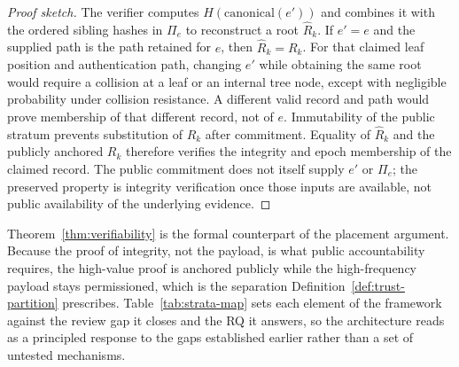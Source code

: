 \begin{proof}[Proof sketch]
The verifier computes $H(\mathrm{canonical}(e'))$ and combines it with the
ordered sibling hashes in $\Pi_e$ to reconstruct a root $\hat{R}_k$. If
$e'=e$ and the supplied path is the path retained for $e$, then
$\hat{R}_k=R_k$. For that claimed leaf position and authentication path, changing
$e'$ while obtaining the same root would require a collision at a leaf or an
internal tree node, except with negligible probability under collision
resistance. A different valid record and path would prove membership of that
different record, not of $e$. Immutability of the public stratum prevents
substitution of $R_k$ after commitment. Equality of
$\hat{R}_k$ and the publicly anchored $R_k$ therefore verifies the integrity and
epoch membership of the claimed record. The public commitment does not itself
supply $e'$ or $\Pi_e$; the preserved property is integrity verification once
those inputs are available, not public availability of the underlying evidence.
\end{proof}

Theorem~\ref{thm:verifiability} is the formal counterpart of the placement argument. Because the proof of integrity, not the payload, is what public accountability requires, the high-value proof is anchored publicly while the high-frequency payload stays permissioned, which is the separation Definition~\ref{def:trust-partition} prescribes. Table~\ref{tab:strata-map} sets each element of the framework against the review gap it closes and the RQ it answers, so the architecture reads as a principled response to the gaps established earlier rather than a set of untested mechanisms.


